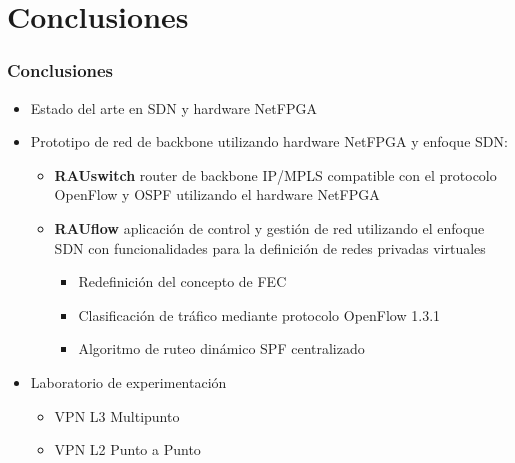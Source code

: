 \documentclass{beamer}
\begin{document}
\section{Conclusiones} 
\frame{\tableofcontents[currentsection]}

%

\begin{frame}
\frametitle{Conclusiones} 

\begin{itemize}[<+->]

\item Estado del arte en SDN y hardware NetFPGA

\item Prototipo de red de backbone utilizando hardware NetFPGA y enfoque SDN:

\pause
\begin{itemize}[<+->]
\item \textbf{RAUswitch} router de backbone IP/MPLS compatible con el protocolo OpenFlow y OSPF utilizando el hardware NetFPGA

\item \textbf{RAUflow} aplicaci\'on de control y gesti\'on de red utilizando el enfoque SDN con funcionalidades para la definici\'on de redes privadas virtuales

\begin{itemize}
\item Redefinici\'on del concepto de FEC
\item Clasificaci\'on de tr\'afico mediante protocolo OpenFlow 1.3.1
\item Algoritmo de ruteo din\'amico SPF centralizado
\end{itemize}
\end{itemize}
\item Laboratorio de experimentaci\'on
\begin{itemize}
\item VPN L3 Multipunto
\item VPN L2 Punto a Punto
\end{itemize}
\end{itemize}

\end{frame}
\end{document}

